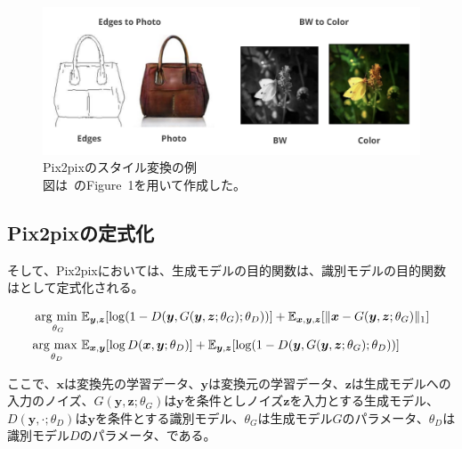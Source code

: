 \clearpage

\begin{figure}[t]
\centering
\includegraphics[width=\columnwidth]{figure/pix2pix_img.png}
\caption[Pix2pixのスタイル変換の例]{Pix2pixのスタイル変換の例\\
図は~\cite{pix2pix}のFigure~1を用いて作成した。}
\label{fig:pix2pix_img}
\end{figure}

\subsection{Pix2pixの定式化}

そして、Pix2pixにおいては、生成モデルの目的関数は、識別モデルの目的関数はとして定式化される。

\begin{align}
    \label{eq:pix2pix_G}
    \mathop{\mathrm{arg~min~}}\limits _{\theta_G}& \mathbb{E}_{\boldsymbol{y}, \boldsymbol{z}}[\log (1-D(\boldsymbol{y}, G(\boldsymbol{y}, \boldsymbol{z}; \theta_G); \theta_D))]+\mathbb{E}_{\boldsymbol{x}, \boldsymbol{y}, \boldsymbol{z}}[\|\boldsymbol{x}-G(\boldsymbol{y}, \boldsymbol{z}; \theta_G)\|_{1}]\\
    \label{eq:pix2pix_D}
    \mathop{\mathrm{arg~max~}}\limits _{\theta_D}& \mathbb{E}_{\boldsymbol{x}, \boldsymbol{y}}[\log D(\boldsymbol{x}, \boldsymbol{y}; \theta_D)]+\mathbb{E}_{\boldsymbol{y}, \boldsymbol{z}}[\log (1-D(\boldsymbol{y}, G(\boldsymbol{y}, \boldsymbol{z}; \theta_G); \theta_D))]
\end{align}

ここで、$\boldsymbol{x}$は変換先の学習データ、$\boldsymbol{y}$は変換元の学習データ、$\boldsymbol{z}$は生成モデルへの入力のノイズ、$G(\boldsymbol{y},\boldsymbol{z};\theta_G)$は$\boldsymbol{y}$を条件としノイズ$\boldsymbol{z}$を入力とする生成モデル、$D(\boldsymbol{y},\cdot;\theta_D)$は$\boldsymbol{y}$を条件とする識別モデル、$\theta_G$は生成モデル$G$のパラメータ、$\theta_D$は識別モデル$D$のパラメータ、である。

